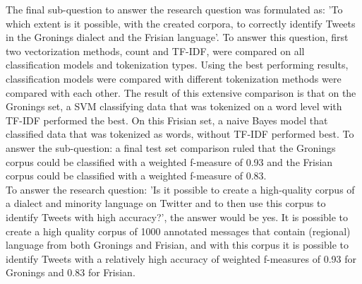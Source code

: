 \documentclass[
10pt, %
a4paper, %
oneside, %
headinclude,footinclude, %
] {book}%
\begin{document}
The final sub-question to answer the research question was formulated as: 'To which extent is it possible, with the created corpora, to correctly identify Tweets in the Gronings dialect and the Frisian language'. To answer this question, first two vectorization methods, count and TF-IDF, were compared on all classification models and tokenization types. Using the best performing results, classification models were compared with different tokenization methods were compared with each other. The result of this extensive comparison is that on the Gronings set, a SVM classifying data that was tokenized on a word level with TF-IDF performed the best. On this Frisian set, a naive Bayes model that classified data that was tokenized as words, without TF-IDF performed best. To answer the sub-question: a final test set comparison ruled that the Gronings corpus could be classified with a weighted f-measure of 0.93 and the Frisian corpus could be classified with a weighted f-measure of 0.83. \\

To answer the research question: 'Is it possible to create a high-quality corpus of a dialect and minority language on Twitter and to then use this corpus to identify Tweets with high accuracy?', the answer would be yes. It is possible to create a high quality corpus of 1000 annotated messages that contain (regional) language from both Gronings and Frisian, and with this corpus it is possible to identify Tweets with a relatively high accuracy of weighted f-measures of 0.93 for Gronings and 0.83 for Frisian.



 

\end{document}
